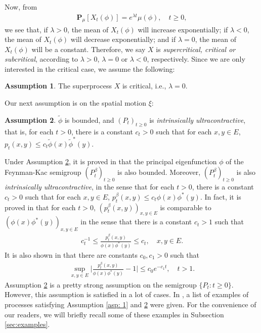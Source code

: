 \documentclass[12pt,a4paper]{amsart}
\theoremstyle{definition}
\newtheorem{asp}{Assumption}
\numberwithin{equation}{section}
\begin{document}
Now, from
\begin{align}
	\mathbf P_\mu[X_t(\phi)]
	= e^{\lambda t} \mu(\phi),
	\quad t \geq 0,
\end{align}
we see that, if $\lambda > 0$, the mean of $X_t(\phi)$ will increase exponentially; if $\lambda < 0$, the mean of $X_t(\phi)$ will decrease exponentially; and if $\lambda = 0$, the mean of $X_t(\phi)$ will be a constant.
Therefore, we say $X$ is \emph{supercritical, critical or subcritical}, according to $\lambda > 0$, $\lambda = 0$ or $\lambda < 0$, respectively.
Since we are only interested in the critical case, we assume the following:
\begin{asp} \label{asp: 2}
  The superprocess $X$ is critical, i.e., $\lambda = 0$.
\end{asp}


Our next assumption is on the spatial motion $\xi$:

\begin{asp} \label{asp: 3}
	$\widetilde \phi$ is bounded, and $(P_t)_{t\geq 0}$ is \emph{intrinsically ultracontractive}, that is, for each $t>0$, there is a constant $c_t >0$ such that for each $x,y\in E$, $p_t(x,y) \leq c_t \widetilde \phi(x) \widetilde \phi^*(y)$.
\end{asp}
	
Under Assumption \ref{asp: 3}, it is proved in \cite{RenSongZhang2015Limit, RenSongZhang2017Central} that the principal eigenfunction $\phi$ of the Feynman-Kac semigroup $(P^\beta_t)_{t\geq 0}$ is also bounded.
Moreover, $(P^\beta_t)_{t\geq 0}$ is also \emph{intrinsically ultracontractive}, in the sense that for each $t>0$, there is a constant $c_t >0$ such that for each $x,y\in E$, $p^\beta_t(x,y) \leq c_t \phi(x) \phi^*(y)$.
In fact, it is proved in \cite{KimSong2008Intrinsic} that for each $t>0$, $(p^\beta_t(x,y))_{x,y\in E}$ is comparable to $(\phi(x)\phi^*(y))_{x,y\in E}$ in the sense that there is a constant $c_t > 1$ such that
\begin{align}\label{eq: p-t-beta is comparable to phi phi-star}
	c_t^{-1}
	\leq \frac {p^\beta_t(x,y)} {\phi(x)\phi^*(y)}
	\leq c_t,
	\quad x,y \in E.
\end{align}
It is also shown in \cite{KimSong2008Intrinsic} that there are constants $c_0, c_1 > 0$ such that
\begin{align}\label{eq:q(t,x,y)}
	\sup_{x,y\in E} \Big|\frac{p^\beta_t(x,y)}{\phi(x)\phi^*(y)} - 1 \Big|
	\leq c_0 e^{-c_1 t},
	\quad t > 1.
\end{align}
Assumption \ref{asp: 3} is a pretty strong assumption on the semigroup $\{P_t : t \ge 0\}$. However, this assumption is satisfied in a lot of cases.  
In \cite{RenSongZhang2015Limit},  a list of examples of processes satisfying Assumption \ref{asp: 1} and \ref{asp: 3} were given. 
For the convenience of our readers, we will
briefly recall some of these examples in Subsection \ref{sec:examples}.
\end{document}
